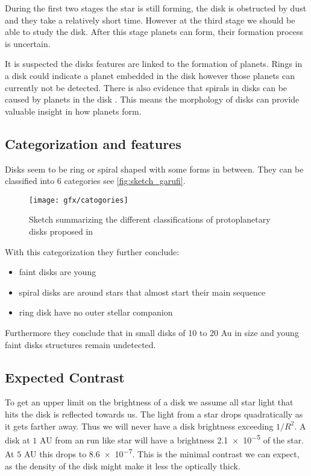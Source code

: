 During the first two stages the star is still forming, the disk is obstructed by dust and they take a relatively short time. However at the third stage we should be able to study the disk. After this stage planets can form, their formation process is uncertain. 

It is suspected the disks features are linked to the formation of planets. Rings in a disk could indicate a planet embedded in the disk \cite{rings} however those planets can currently not be detected. There is also evidence that spirals in disks can be caused by planets in the disk \cite{garufi}. This means the morphology of disks can provide valuable insight in how planets form.

\subsection{Categorization and features}

Disks seem to be ring or spiral shaped with some forms in between. They can be classified into 6 categories \cite{garufi} see \autoref{fig:sketch_garufi}. 

\begin{figure}[H]
    \caption{Sketch summarizing the different classifications of protoplanetary disks proposed in \cite{garufi}}
    \centering
    \texttt{[image: gfx/catogories]}
    \label{fig:sketch_garufi}
\end{figure}

With this categorization they \cite{garufi} further conclude:
\begin{itemize}
    \item faint disks are young
    \item spiral disks are around stars that almost start their main sequence
    \item ring disk have no outer stellar companion %
\end{itemize}

Furthermore they \cite{garufi} conclude that in small disks of 10 to 20 Au in size and young faint disks structures remain undetected.

\subsection{Expected Contrast}

To get an upper limit on the brightness of a disk we assume all star light that hits the disk is reflected towards us. The light from a star drops quadratically as it gets farther away. Thus we will never have a disk brightness exceeding $1/R^2$. A disk at $1$ AU from an run like star will have a brightness \num{2.1e-5} of the star. At $5$ AU this drops to \num{8.6e-7}. This is the minimal contrast we can expect, as the density of the disk might make it less the optically thick.

